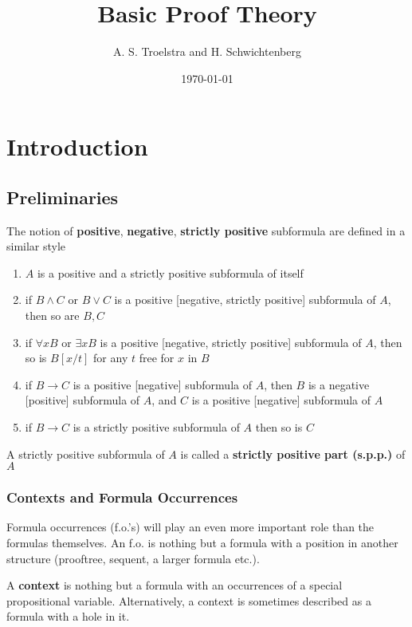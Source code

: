 \documentclass[11pt]{article}
\author{A. S. Troelstra and H. Schwichtenberg}
\date{\today}
\title{Basic Proof Theory}
\begin{document}
\maketitle
\tableofcontents \clearpage
\section{Introduction}
\label{sec:org9cf8e24}
\subsection{Preliminaries}
\label{sec:orgd7ac6a5}
\begin{definition}[]
The notion of \textbf{positive}, \textbf{negative}, \textbf{strictly positive} subformula are defined
in a similar style
\begin{enumerate}
\item \(A\) is a positive and a strictly positive subformula of itself
\item if \(B\wedge C\) or \(B\vee C\) is a positive [negative, strictly positive]
subformula of \(A\), then so are \(B,C\)
\item if \(\forall xB\) or \(\exists xB\) is a positive [negative, strictly
positive] subformula of \(A\), then so is \(B[x/t]\) for any \(t\) free for \(x\)
in \(B\)
\item if \(B\to C\) is a positive [negative] subformula of \(A\), then \(B\) is a
negative [positive] subformula of \(A\), and \(C\) is a positive [negative]
subformula of \(A\)
\item if \(B\to C\) is a strictly positive subformula of \(A\) then so is \(C\)
\end{enumerate}


A strictly positive subformula of \(A\) is called a \textbf{strictly positive part
(s.p.p.)} of \(A\)
\end{definition}
\subsubsection{Contexts and Formula Occurrences}
\label{sec:org2f9cdcd}
Formula occurrences (f.o.'s) will play an even more important role than the
formulas themselves. An f.o. is nothing but a formula with a position in
another structure (prooftree, sequent, a larger formula etc.).

A \textbf{context} is nothing but a formula with an occurrences of a special
propositional variable. Alternatively, a context is sometimes described as a
formula with a hole in it. 
\end{document}

